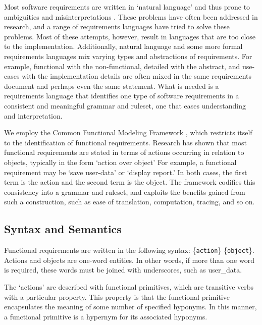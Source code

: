 \documentclass[letterpaper,10pt]{article}
\begin{document}
        Most software requirements are written in `natural language'
        \cite{mich_et_al,neill_laplante} and thus prone to
        ambiguities \cite{berry_et_al} and misinterpretations
        \cite{gervasi_zowghi}. These problems have often been
        addressed in research, and a range of requirements languages
        have tried to solve these problems. Most of these attempts,
        however, result in languages that are too close to the
        implementation. Additionally, natural language and some more
        formal requirements languages mix varying types and
        abstractions of requirements. For example, functional with the
        non-functional, detailed with the abstract, and use-cases with the
        implementation details are often mixed in the same requirements
        document and perhaps even the same statement. What is needed
        is a requirements language that identifies one type of
        software requirements in a consistent and meaningful grammar
        and ruleset, one that eases understanding and interpretation.

        We employ the Common Functional Modeling Framework
        \cite{amoussou,amoussou_rohmer,eckroth}, which restricts
        itself to the identification of functional
        requirements. Research has shown that most functional
        requirements are stated in terms of actions occurring in
        relation to objects, typically in the form `action over
        object' \cite{eckroth} For example, a functional requirement
        may be `save user-data' or `display report.' In both cases,
        the first term is the action and the second term is the
        object. The framework codifies this consistency into a grammar
        and ruleset, and exploits the benefits gained from such a
        construction, such as ease of translation, computation,
        tracing, and so on.
	
		\subsection{Syntax and Semantics}
               
                Functional requirements are written in the following
                syntax: \{\texttt{action}\} \{\texttt{object}\}. Actions and
                objects are one-word entities. In other words, if more
                than one word is required, these words must be joined
                with underscores, such as user\_data.
		
                The `actions' are described with functional
                primitives, which are transitive verbs with a
                particular property. This property is that the
                functional primitive encapsulates the meaning of some
                number of specified hyponyms. In this manner, a
                functional primitive is a hypernym for its associated
                hyponyms.
\end{document}
